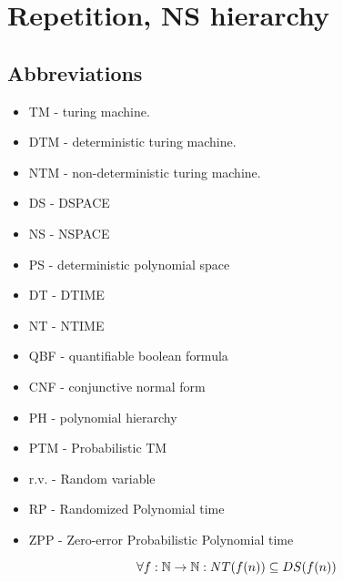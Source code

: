 \section{\texorpdfstring{Repetition, NS hierarchy}{Repetition, NS hierarchy}}
\vspace{5mm}
\large

\subsection{Abbreviations}
\begin{itemize}
	\item TM - turing machine.
	\item DTM - deterministic turing machine.
	\item NTM - non-deterministic turing machine.
	\item DS - DSPACE
	\item NS - NSPACE
	\item PS - deterministic polynomial space
	\item DT - DTIME
	\item NT - NTIME
	\item QBF - quantifiable boolean formula
	\item CNF - conjunctive normal form
	\item PH - polynomial hierarchy
	\item PTM - Probabilistic TM
	\item r.v. - Random variable
	\item RP - Randomized Polynomial time
	\item ZPP - Zero-error Probabilistic Polynomial time
\end{itemize}

\begin{theorem}\label{nt_ds_rel}
	\[ \forall f:\operatorname{\mathbb{N}} \to \operatorname{\mathbb{N}}: NT(f(n)) \subseteq DS(f(n)) \]
\end{theorem}

